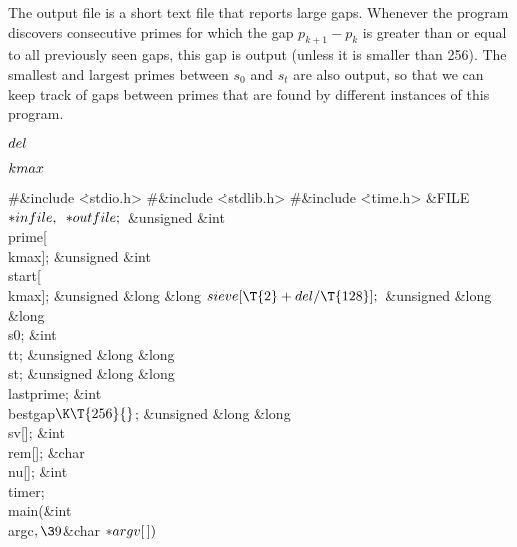 The output file is a short text file that reports large gaps.
Whenever the program discovers consecutive primes for which the gap
$p_{k+1}-p_k$ is greater than or equal to all previously seen gaps,
this gap is output (unless it is smaller than 256).
The smallest and largest
primes between $s_0$ and $s_t$ are also output, so that we can keep
track of gaps between primes that are
found by different instances of this program.

\Y\B\4\D$\\{del}$ \5
\par
\B\4\D$\\{kmax}$ \5
\par
\Y\B\8\#\&{include} \.{<stdio.h>}\6
\8\#\&{include} \.{<stdlib.h>}\6
\8\#\&{include} \.{<time.h>}\6
\&{FILE} ${}{*}\\{infile},{}$ ${}{*}\\{outfile};{}$\6
\&{unsigned} \&{int} \\{prime}[\\{kmax}];\6
\&{unsigned} \&{int} \\{start}[\\{kmax}];\6
\&{unsigned} \&{long} \&{long} ${}\\{sieve}[\T{2}+\\{del}/\T{128}];{}$\6
\&{unsigned} \&{long} \&{long} \\{s0};\6
\&{int} \\{tt};\6
\&{unsigned} \&{long} \&{long} \\{st};\6
\&{unsigned} \&{long} \&{long} \\{lastprime};%
\6
\&{int} \\{bestgap}${}\K\T{256}{}$;\6
\&{unsigned} \&{long} \&{long} \\{sv}[];\6
\&{int} \\{rem}[];\6
\&{char} \\{nu}[];\6
\&{int} \\{timer};\7
\\{main}(\&{int} \\{argc}${},\39{}$\&{char} ${}{*}\\{argv}[\,]){}$\1\1\2\2\6
